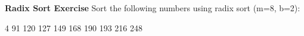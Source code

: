 \documentclass{article}
\begin{document}
\textbf{Radix Sort Exercise}
\newline Sort the following numbers using radix sort (m=8, b=2):
\begin{center}
4 91 120 127 149 168 190 193 216 248 \end{center}
\end{document}
